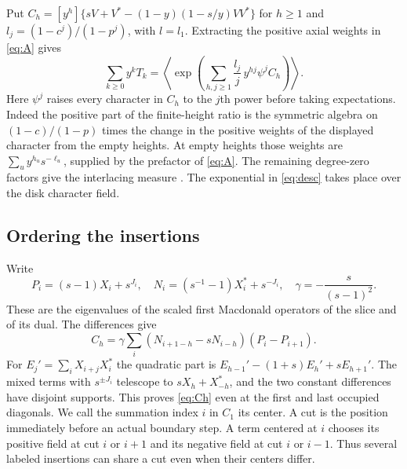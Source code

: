 Put $C_h=[y^h]\{sV+V^*-(1-y)(1-s/y)VV^*\}$ for $h\ge1$ and $l_j=(1-c^j)/(1-p^j)$, with $l=l_1$. Extracting the positive axial weights in \eqref{eq:A} gives
\begin{equation}\label{eq:desc}
 \sum_{k\ge0}y^k T_k
 =\left\langle\exp\left(\sum_{h,j\ge1}
             \frac{l_j}{j}\,y^{hj}\psi^j C_h\right)\right\rangle .
\end{equation}
Here $\psi^j$ raises every character in $C_h$ to the $j$th power before taking expectations. Indeed the positive part of the finite-height ratio is the symmetric algebra on $(1-c)/(1-p)$ times the change in the positive weights of the displayed character from the empty heights. At empty heights those weights are $\sum_u y^{h_u}s^{-\ell_u}$, supplied by the prefactor of \eqref{eq:A}. The remaining degree-zero factors give the interlacing measure \cite[\S5.2--5.3]{W1}. The exponential in \eqref{eq:desc} takes place over the disk character field.

\subsection{Ordering the insertions}
Write
\[
 P_i=(s-1)X_i+s^{J_i},\quad N_i=(s^{-1}-1)X_i^*+s^{-J_i},
 \quad \gamma=-\frac{s}{(s-1)^2}.
\]
These are the eigenvalues of the scaled first Macdonald operators of the slice and of its dual. The differences give
\begin{equation}\label{eq:Ch}
 C_h=\gamma\sum_i (N_{i+1-h}-sN_{i-h})(P_i-P_{i+1}).
\end{equation}
For $E_j'=\sum_iX_{i+j}X_i^*$ the quadratic part is
$E_{h-1}'-(1+s)E_h'+sE_{h+1}'$. The mixed terms with $s^{\pm J_i}$ telescope to $sX_h+X_{-h}^*$, and the two constant differences have disjoint supports. This proves \eqref{eq:Ch} even at the first and last occupied diagonals. We call the summation index $i$ in $C_1$ its center. A cut is the position immediately before an actual boundary step. A term centered at $i$ chooses its positive field at cut $i$ or $i+1$ and its negative field at cut $i$ or $i-1$. Thus several labeled insertions can share a cut even when their centers differ.

